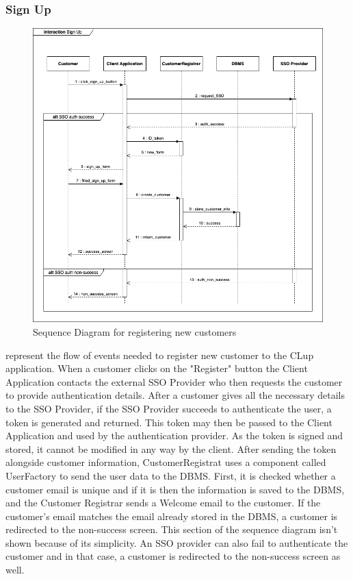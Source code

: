 \subsubsection{Sign Up}
\begin{figure}[H]
    \centering
    \includegraphics[height=0.6\textwidth]{Images/SequenceDiagrams/SignUp.png}
    \caption{Sequence Diagram for registering new customers}
    \label{fig:SDSignUp}
\end{figure}
 represent the flow of events needed to register new customer to the CLup application.
When a customer clicks on the "Register" button the Client Application contacts the external SSO Provider who then requests the customer to provide authentication details.
After a customer gives all the necessary details to the SSO Provider, if the SSO Provider succeeds to authenticate the user, a token is generated and returned.
This token may then be passed to the Client Application and used by the authentication provider.
As the token is signed and stored, it cannot be modified in any way by the client. After sending the token alongside customer information, CustomerRegistrat uses a component called UserFactory to send the user data to the DBMS.
First, it is checked whether a customer email is unique and if it is then the information is saved to the DBMS, and the Customer Registrar sends a Welcome email to the customer.
If the customer's email matches the email already stored in the DBMS, a customer is redirected to the non-success screen. This section of the sequence diagram isn't shown because of its simplicity.
An SSO provider can also fail to authenticate the customer and in that case, a customer is redirected to the non-success screen as well.

